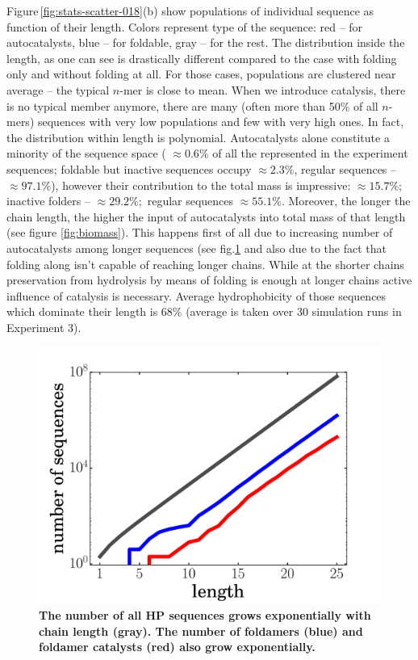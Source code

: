 \documentclass[journal=jacsat,manuscript=article,layout=twocolumn]{achemso}
\begin{document}
Figure\,\ref{fig:stats-scatter-018}(b) show populations of individual sequence as function of 
their 
length. Colors represent type of the sequence: red -- for autocatalysts, blue -- for foldable, 
gray 
-- for the rest. The distribution inside the length, as one can see is drastically different 
compared to the case with folding only and without folding at all. For those cases, populations 
are clustered near average -- the typical $n$-mer is close to mean. When we introduce catalysis, 
there is no typical member anymore, there are many (often more than  50\% of all $n$-mers) 
sequences with very low populations and few with very high ones. In fact, the distribution within 
length is polynomial. Autocatalysts alone constitute a minority of the sequence space ( 
$\approx 
0.6\%$ 
of all the represented in the experiment sequences; foldable but inactive sequences occupy 
$\approx 
2.3\%$, regular sequences -- $\approx97.1\%$), however their contribution to the total mass is 
impressive: 
$\approx 15.7\%$; inactive folders -- $\approx 29.2\%;$ regular sequences $\approx 55.1\%$. 
Moreover, the longer the chain length, the higher the input of autocatalysts into total mass of 
that length (see figure \ref{fig:biomass}). This happens first of all due to increasing number of 
autocatalysts among longer sequences (see fig.\ref{fig:hp-statistics} and also due to the fact 
that 
folding along isn't capable of reaching longer chains. While at the shorter chains preservation 
from hydrolysis by means of folding is enough at longer chains active influence of catalysis is 
necessary. Average hydrophobicity of those sequences which dominate their length is $68\%$ (average 
is taken over 30 simulation runs in Experiment 3).
\begin{figure}[hbt!]
  \centering
  \includegraphics[width=\columnwidth]{pictures/hp-statistics.pdf} 
  \caption{\footnotesize{\textbf{The number of all HP sequences grows exponentially with chain 
length (gray).  The number of foldamers (blue) and foldamer catalysts (red) also grow 
exponentially.}}}
  \label{fig:hp-statistics}
\end{figure}
\end{document}
